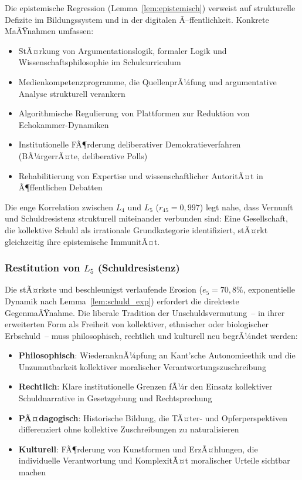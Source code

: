 ﻿\documentclass[a4paper,12pt]{article}
\theoremstyle{definition}
\begin{document}
Die epistemische Regression (Lemma~\ref{lem:epistemisch}) verweist auf strukturelle Defizite im Bildungssystem und in der digitalen Ã–ffentlichkeit. Konkrete MaÃŸnahmen umfassen:
\begin{itemize}
	\item StÃ¤rkung von Argumentationslogik, formaler Logik und Wissenschaftsphilosophie im Schulcurriculum
	\item Medienkompetenzprogramme, die QuellenprÃ¼fung und argumentative Analyse strukturell verankern
	\item Algorithmische Regulierung von Plattformen zur Reduktion von Echokammer-Dynamiken
	\item Institutionelle FÃ¶rderung deliberativer Demokratieverfahren (BÃ¼rgerrÃ¤te, deliberative Polls)
	\item Rehabilitierung von Expertise und wissenschaftlicher AutoritÃ¤t in Ã¶ffentlichen Debatten
\end{itemize}
Die enge Korrelation zwischen $L_4$ und $L_5$ ($r_{45} = 0{,}997$) legt nahe, dass Vernunft und Schuldresistenz strukturell miteinander verbunden sind: Eine Gesellschaft, die kollektive Schuld als irrationale Grundkategorie identifiziert, stÃ¤rkt gleichzeitig ihre epistemische ImmunitÃ¤t.

\subsubsection{Restitution von $L_5$ (Schuldresistenz)}

Die stÃ¤rkste und beschleunigst verlaufende Erosion ($e_5 = 70{,}8\%$, exponentielle Dynamik nach Lemma~\ref{lem:schuld_exp}) erfordert die direkteste GegenmaÃŸnahme. Die liberale Tradition der Unschuldsvermutung~-- in ihrer erweiterten Form als Freiheit von kollektiver, ethnischer oder biologischer Erbschuld~-- muss philosophisch, rechtlich und kulturell neu begrÃ¼ndet werden:

\begin{itemize}
	\item \textbf{Philosophisch}: WiederanknÃ¼pfung an Kant'sche Autonomieethik und die Unzumutbarkeit kollektiver moralischer Verantwortungszuschreibung
	\item \textbf{Rechtlich}: Klare institutionelle Grenzen fÃ¼r den Einsatz kollektiver Schuldnarrative in Gesetzgebung und Rechtsprechung
	\item \textbf{PÃ¤dagogisch}: Historische Bildung, die TÃ¤ter- und Opferperspektiven differenziert ohne kollektive Zuschreibungen zu naturalisieren
	\item \textbf{Kulturell}: FÃ¶rderung von Kunstformen und ErzÃ¤hlungen, die individuelle Verantwortung und KomplexitÃ¤t moralischer Urteile sichtbar machen
\end{itemize}
\end{document}
